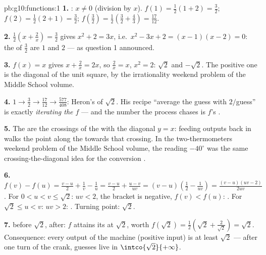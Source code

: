 \begin{solution}{pb:g10:functions:1}
\textbf{1.} : $x \neq 0$ (division by $x$). $f(1) =
\frac12(1 + 2) = \frac32$; $f(2) = \frac12(2 + 1) = \frac32$;
$f\!\left(\frac32\right) = \frac12\left(\frac32 +
\frac43\right) = \frac{17}{12}$.

\textbf{2.} $\frac12\left(x + \frac2x\right) = \frac32$ gives
$x^2 + 2 = 3x$, i.e.\ $x^2 - 3x + 2 = (x - 1)(x - 2) = 0$: the
 of $\frac32$ are $1$ and $2$ --- as question 1
announced.

\textbf{3.} $f(x) = x$ gives $x + \frac2x = 2x$, so
$\frac2x = x$, $x^2 = 2$:  $\sqrt2$ and $-\sqrt2$.
The positive one is the diagonal of the unit square, 
by the irrationality weekend problem of the Middle School volume.

\textbf{4.} $1 \to \frac32 \to \frac{17}{12} \to
\frac{577}{408}$: Heron's  of $\sqrt2$. His
recipe ``average the guess with $2/$guess'' is exactly
\emph{iterating the  $f$} --- and the number the
process chases is $f$'s .

\textbf{5.} The  are the crossings of the 
with the diagonal $y = x$: feeding outputs back in walks the
point along the  towards that crossing. In
the two-thermometers weekend problem of the Middle School volume, the reading $-40^\circ$ was the same
crossing-the-diagonal idea for the conversion .

\textbf{6.} $f(v) - f(u) = \frac{v - u}{2} + \frac1v - \frac1u
= \frac{v - u}{2} + \frac{u - v}{uv}
= (v - u)\left(\frac12 - \frac{1}{uv}\right)
= \frac{(v - u)(uv - 2)}{2uv}$. For $0 < u < v \leq \sqrt2$:
$uv < 2$, the bracket is negative, $f(v) < f(u)$: .
For $\sqrt2 \leq u < v$: $uv > 2$: . Turning point:
$\sqrt2$.

\textbf{7.}  before $\sqrt2$,  after: $f$
attains its  at $\sqrt2$, worth
$f(\sqrt2) = \frac12\left(\sqrt2 + \frac{2}{\sqrt2}\right)
= \sqrt2$. Consequence: every output of the machine (positive
input) is at least $\sqrt2$ --- after one turn of the crank,
guesses live in $\intco{\sqrt2}{+\infty}$.


\end{solution}
